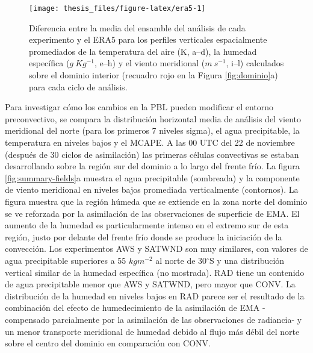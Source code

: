 \documentclass[12pt,oneside,a4paper]{reedthesis}
\begin{document}
\begin{figure}

{\centering \texttt{[image: thesis\_files/figure-latex/era5-1]} 

}

\caption{Diferencia entre la media del ensamble del análisis de cada experimento y el ERA5 para los perfiles verticales espacialmente promediados de la temperatura del aire (K, a--d), la humedad específica (\(g\ Kg^{-1}\), e--h) y el viento meridional (\(m\ s^{-1}\), i--l) calculados sobre el dominio interior (recuadro rojo en la Figura \ref{fig:dominio}a) para cada ciclo de análisis.}\label{fig:era5}
\end{figure}
Para investigar cómo los cambios en la PBL pueden modificar el entorno preconvectivo, se compara la distribución horizontal media de análisis del viento meridional del norte (para los primeros 7 niveles sigma), el agua precipitable, la temperatura en niveles bajos y el MCAPE. A las 00 UTC del 22 de noviembre (después de 30 ciclos de asimilación) las primeras células convectivas se estaban desarrollando sobre la región sur del dominio a lo largo del frente frío. La figura \ref{fig:summary-fields}a muestra el agua precipitable (sombreada) y la componente de viento meridional en niveles bajos promediada verticalmente (contornos). La figura muestra que la región húmeda que se extiende en la zona norte del dominio se ve reforzada por la asimilación de las observaciones de superficie de EMA. El aumento de la humedad es particularmente intenso en el extremo sur de esta región, justo por delante del frente frío donde se produce la iniciación de la convección. Los experimentos AWS y SATWND son muy similares, con valores de agua precipitable superiores a 55 \(kgm^{-2}\) al norte de 30\(^{\circ}\)S y una distribución vertical similar de la humedad específica (no mostrada). RAD tiene un contenido de agua precipitable menor que AWS y SATWND, pero mayor que CONV. La distribución de la humedad en niveles bajos en RAD parece ser el resultado de la combinación del efecto de humedecimiento de la asimilación de EMA -compensado parcialmente por la asimilación de las observaciones de radiancia- y un menor transporte meridional de humedad debido al flujo más débil del norte sobre el centro del dominio en comparación con CONV.
\end{document}
